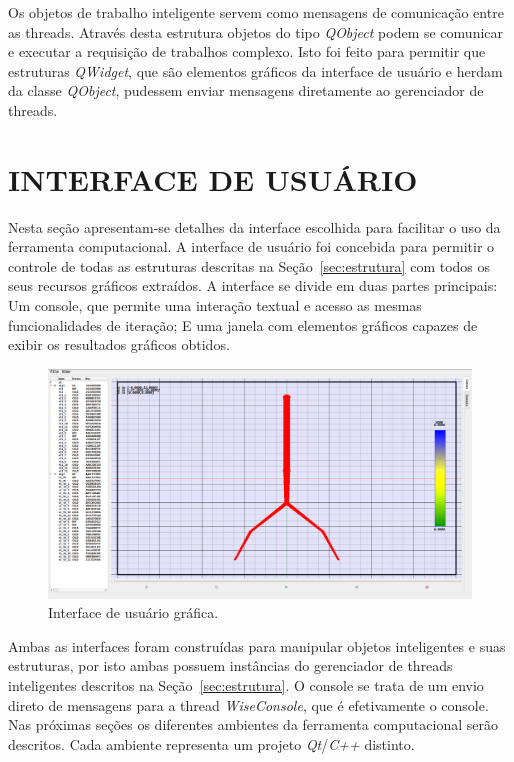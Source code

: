 \documentclass[a4paper,12pt]{monografia}
\theoremstyle{plain}
\theoremstyle{definition}
\theoremstyle{remark}
\begin{document}
Os objetos de trabalho inteligente servem como mensagens de comunicação entre as threads. Através desta estrutura objetos do tipo \textit{QObject} podem se comunicar e executar a requisição de trabalhos complexo. Isto foi feito para permitir que estruturas \textit{QWidget}, que são elementos gráficos da interface de usuário e herdam da classe \textit{QObject}, pudessem enviar mensagens diretamente ao gerenciador de threads.

\section{INTERFACE DE USUÁRIO}\label{sec:userinterface}

Nesta seção apresentam-se detalhes da interface escolhida para facilitar o uso da ferramenta computacional. A interface de usuário foi concebida para permitir o controle de todas as estruturas descritas na Seção~\ref{sec:estrutura} com todos os seus recursos gráficos extraídos. A interface se divide em duas partes principais: Um console, que permite uma interação textual e acesso as mesmas funcionalidades de iteração; E uma janela com elementos gráficos capazes de exibir os resultados gráficos obtidos. 

\begin{figure}[!htbp]
	\centering
	\includegraphics[width=\linewidth]{Figures/IGU_002.png}
	\caption{Interface de usuário gráfica.}
	\label{fig10:UI}
\end{figure}

Ambas as interfaces foram construídas para manipular objetos inteligentes e suas estruturas, por isto ambas possuem instâncias do gerenciador de threads inteligentes descritos na Seção~\ref{sec:estrutura}. O console se trata de um envio direto de mensagens para a thread \textit{WiseConsole}, que é efetivamente o console. Nas próximas seções os diferentes ambientes da ferramenta computacional serão descritos. Cada ambiente representa um projeto \textit{Qt}/\textit{C++} distinto.
\end{document}
